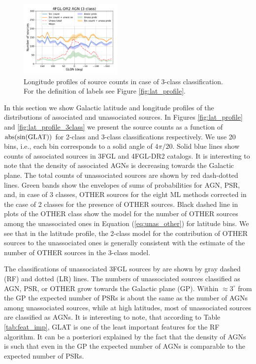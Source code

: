 \begin{figure}[h]
\includegraphics[width=0.45\textwidth]{plots/lon_profile_AGN_4FGL-DR2_3classes.pdf}
\caption{Longitude profiles of source counts in case of 3-class classification. For the definition of labels see Figure \ref{fig:lat_profile}.}  
\label{fig:lon_profile_3class}
\end{figure}


In this section we show Galactic latitude and longitude profiles of the distributions of associated and unassociated sources.
In Figures \ref{fig:lat_profile} and \ref{fig:lat_profile_3class} we present the source counts as a function of ${\rm abs(sin(GLAT))}$ 
for 2-class and 3-class classifications respectively.
We use 20 bins, i.e., each bin corresponds to a solid angle of $4 \pi / 20$. 
Solid blue lines show counts of associated sources in 3FGL and 4FGL-DR2  catalogs.
It is interesting to note that the density of associated AGNs is decreasing towards the Galactic plane.
The total counts of unassociated sources are shown by red dash-dotted lines.
Green bands show the envelopes of sums of probabilities for AGN, PSR, and, in case of 3 classes, OTHER sources for the eight ML methods corrected in the case of 2 classes for the presence of OTHER sources.
Black dashed line in plots of the OTHER class show the model for the number of OTHER sources among the unassociated ones
in Equation (\ref{eq:unas_other}) for latitude bins.
We see that in the latitude profile, the 2-class model for the contribution of OTHER sources to the unassociated ones is generally consistent with the estimate of the number of OTHER sources in the 3-class model.

The classifications of unassociated 3FGL sources by \cite{2016ApJ...820....8S} are shown by gray dashed (RF) and dotted (LR) lines.
The numbers of unassociated sources classified as AGN, PSR, or OTHER grow towards the Galactic plane (GP).
Within $\approx 3^\circ$ from the GP the expected number of PSRs is about the same as the number of AGNs among unassociated sources, while at high latitudes, most of unassociated sources are classified as AGNs.
It is interesting to note, that according to Table \ref{tab:feat_imp}, GLAT is one of the least important features for the RF algorithm.
It can be a posteriori explained by the fact that the density of AGNs is such that even in the GP the expected number of AGNs is comparable to the expected number of PSRs.

